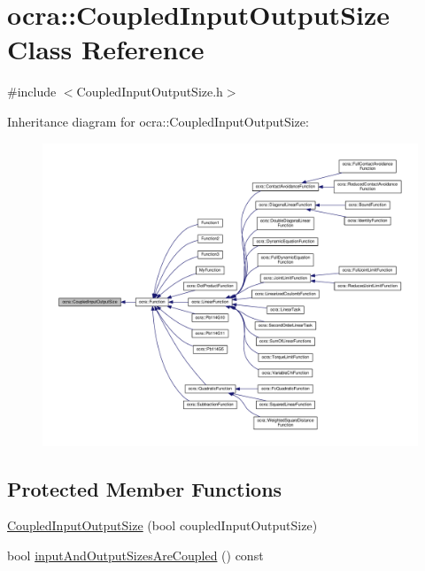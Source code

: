 \hypertarget{classocra_1_1CoupledInputOutputSize}{}\section{ocra\+:\+:Coupled\+Input\+Output\+Size Class Reference}
\label{classocra_1_1CoupledInputOutputSize}


{\ttfamily \#include $<$Coupled\+Input\+Output\+Size.\+h$>$}



Inheritance diagram for ocra\+:\+:Coupled\+Input\+Output\+Size\+:
\nopagebreak
\begin{figure}[H]
\begin{center}
\leavevmode
\includegraphics[width=350pt]{db/d0d/classocra_1_1CoupledInputOutputSize__inherit__graph}
\end{center}
\end{figure}
\subsection*{Protected Member Functions}
\begin{DoxyCompactItemize}
\item 
\hyperlink{classocra_1_1CoupledInputOutputSize_a464c947e199233598a248ff6409ab93d}{Coupled\+Input\+Output\+Size} (bool coupled\+Input\+Output\+Size)
\item 
bool \hyperlink{classocra_1_1CoupledInputOutputSize_a6a71f5169773ba0cd4a1b23d66368a9d}{input\+And\+Output\+Sizes\+Are\+Coupled} () const 
\end{DoxyCompactItemize}


